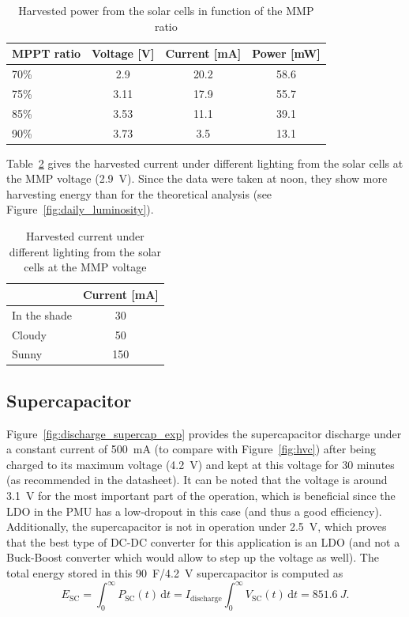 \documentclass{EPL-master-thesis-covers-EN}
\newcommand{\te}[1]{\textrm{#1}}
\begin{document}
\begin{table}[H]
\centering
\begin{tabular}{lccc}
\toprule
  MPPT ratio & Voltage [V] & Current [mA] & Power [mW]  \\ \midrule
 70\%        & 2.9         & 20.2         & 58.6        \\
 75\%        & 3.11        & 17.9         & 55.7        \\
 85\%        & 3.53        & 11.1         & 39.1        \\
 90\%        & 3.73        & 3.5          & 13.1        \\ \bottomrule
\end{tabular}
\caption{Harvested power from the solar cells in function of the MMP ratio}
\label{tab:val_current_solar_sel}
\end{table}


Table~\ref{tab:val_current_harvested} gives the harvested current under different lighting from the solar cells at the MMP voltage (\SI{2.9}{V}). Since the data were taken at noon, they show more harvesting energy than for the theoretical analysis (see Figure~\ref{fig:daily_luminosity}).

\begin{table}[H]
\centering
\begin{tabular}{lc}
\toprule
                     & Current [\si{mA}]  \\ \midrule
 In the shade        & 30                 \\
 Cloudy              & 50                 \\
 Sunny               & 150                \\ \bottomrule
\end{tabular}
\caption{Harvested current under different lighting from the solar cells at the MMP voltage}
\label{tab:val_current_harvested}
\end{table}

\subsection*{Supercapacitor}

Figure~\ref{fig:discharge_supercap_exp} provides the supercapacitor discharge under a constant current of \SI{500}{mA} (to compare with Figure~\ref{fig:hvc}) after being charged to its maximum voltage (\SI{4.2}{V}) and kept at this voltage for 30 minutes (as recommended in the datasheet). It can be noted that the voltage is around \SI{3.1}{V} for the most important part of the operation, which is beneficial since the LDO in the PMU has a low-dropout in this case (and thus a good efficiency). Additionally, the supercapacitor is not in operation under \SI{2.5}{V}, which proves that the best type of DC-DC converter for this application is an LDO (and not a Buck-Boost converter which would allow to step up the voltage as well). The total energy stored in this \SI{90}{F}/\SI{4.2}{V} supercapacitor is computed as
\[
 E_\te{SC} = \int_0^\infty P_\te{SC}(t) \, \te{d} t = I_\te{discharge} \int_0^\infty V_\te{SC}(t) \, \te{d} t = \SI{851.6}{J}.
\]
\end{document}
